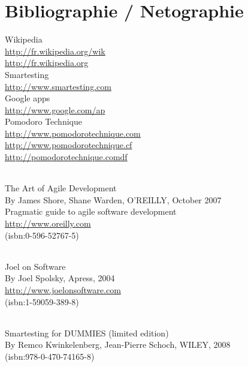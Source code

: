 ﻿\chapter{Bibliographie / Netographie}

Wikipedia\\
\url{http://fr.wikipedia.org/wik}\\
\url{http://fr.wikipedia.org}\\

Smartesting\\
\url{http://www.smartesting.com}\\

Google apps\\
\url{http://www.google.com/ap}\\

Pomodoro Technique\\
\url{http://www.pomodorotechnique.com}\\
\url{http://www.pomodorotechnique.cf}\\
\url{http://pomodorotechnique.comdf}



\subparagraph*{}
The Art of Agile Development \\
By James Shore, Shane Warden, O'REILLY, October 2007\\
Pragmatic guide to agile software development\\
\url{http://www.oreilly.com}\\
(isbn:0-596-52767-5)

\subparagraph*{}
Joel on Software\\
By Joel Spolsky, Apress, 2004\\
\url{http://www.joelonsoftware.com}\\
(isbn:1-59059-389-8)

\subparagraph*{}
Smartesting for DUMMIES (limited edition)\\
By Remco Kwinkelenberg, Jean-Pierre Schoch, WILEY, 2008\\
(isbn:978-0-470-74165-8)
